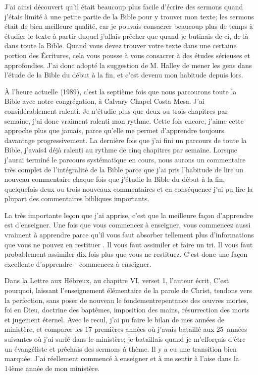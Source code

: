 J'ai ainsi découvert qu’il était beaucoup plus facile d’écrire des sermons quand j’étais limité à une petite partie de la
Bible pour y trouver mon texte; les sermons était de bien meilleure qualité, car je pouvais consacrer beaucoup plus de
temps à étudier le texte à partir duquel j’allais prêcher que quand je butinais de ci, de là dans toute la Bible. Quand
vous devez trouver votre texte dans une certaine portion des Écritures, cela vous pousse à vous consacrer à des
études sérieuses et approfondies. J’ai donc adopté la suggestion de M. Halley de mener les gens dans l'étude de la
Bible du début à la fin, et c’est devenu mon habitude depuis lors.

À l’heure actuelle (1989), c'est la septième fois que nous parcourons toute la Bible avec notre congrégation, à Calvary
Chapel Costa Mesa. J’ai considérablement ralenti. Je n’étudie plus que deux ou trois chapitres par semaine, j’ai donc
vraiment ralenti mon rythme. Cette fois encore, j’aime cette approche plus que jamais, parce qu'elle me permet
d'apprendre toujours davantage progressivement. La dernière fois que j’ai fini un parcours de toute la Bible, j'avais4
déjà ralenti au rythme de cinq chapitres par semaine. Lorsque j’aurai terminé le parcours systématique en cours,
nous aurons un commentaire très complet de l’intégralité de la Bible parce que j’ai pris l’habitude de lire un nouveau
commentaire chaque fois que j’étudie la Bible du début à la fin, quelquefois deux ou trois nouveaux commentaires et
en conséquence j’ai pu lire la plupart des commentaires bibliques importants.

La très importante leçon que j’ai apprise, c’est que la meilleure façon d’apprendre est d’enseigner. Une fois que vous
commencez à enseigner, vous commencez aussi vraiment à apprendre parce qu’il vous faut absorber tellement plus
d’informations que vous ne pouvez en restituer . Il vous faut assimiler et faire un tri. Il vous faut probablement
assimiler dix fois plus que vous ne restituez. C’est donc une façon excellente d’apprendre - commencez à enseigner.

Dans la Lettre aux Hébreux, au chapitre VI, verset 1, l’auteur écrit, \og C’est pourquoi, laissant l’enseignement
élémentaire de la parole de Christ, tendons vers la perfection, sans poser de nouveau le fondement\frcolon repentance des
œuvres mortes, foi en Dieu, doctrine des baptêmes, imposition des mains, résurrection des morts et jugement
éternel.\fg{} Avec le recul, j'ai pu faire le bilan de mes années de ministère, et comparer les 17 premières années où
j'avais \og bataillé \fg{} aux 25~années suivantes où j'ai \og surfé \fg{} dans le ministère; je \og bataillais \fg{} quand je m'efforçais d’être un
évangéliste et prêchais des sermons à thème. Il y a eu une transition bien marquée. J’ai réellement commencé à
enseigner et à me sentir à l’aise dans la 14ème année de mon ministère.

